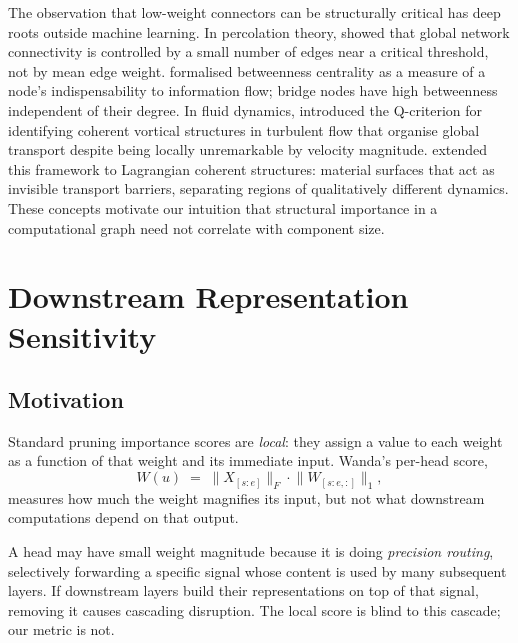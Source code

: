 \documentclass[11pt,a4paper]{article}
\theoremstyle{definition}
\theoremstyle{plain}
\begin{document}
The observation that low-weight connectors can be structurally critical
has deep roots outside machine learning.
In percolation theory, \citet{broadbent1957percolation} showed that global
network connectivity is controlled by a small number of edges near a
critical threshold, not by mean edge weight.
\citet{freeman1977betweenness} formalised betweenness centrality as a
measure of a node's indispensability to information flow; bridge nodes have
high betweenness independent of their degree.
In fluid dynamics, \citet{hunt1988eddies} introduced the Q-criterion for
identifying coherent vortical structures in turbulent flow that organise
global transport despite being locally unremarkable by velocity magnitude.
\citet{haller2000lagrangian} extended this framework to Lagrangian
coherent structures: material surfaces that act as invisible transport
barriers, separating regions of qualitatively different dynamics.
These concepts motivate our intuition that structural importance in a
computational graph need not correlate with component size.

\section{Downstream Representation Sensitivity}
\label{sec:method}

\subsection{Motivation}
\label{sec:motivation}

Standard pruning importance scores are \emph{local}: they assign a value
to each weight as a function of that weight and its immediate input.
Wanda's per-head score,
\begin{equation}
    W(u) \;=\;
    \bigl\|X_{[s:e]}\bigr\|_{F}
    \cdot
    \bigl\|W_{[s:e,:]}\bigr\|_{1},
    \label{eq:wanda}
\end{equation}
measures how much the weight magnifies its input, but not what downstream
computations depend on that output.

A head may have small weight magnitude because it is doing
\emph{precision routing}, selectively forwarding a specific signal whose
content is used by many subsequent layers.
If downstream layers build their representations on top of that signal,
removing it causes cascading disruption.
The local score is blind to this cascade; our metric is not.
\end{document}
